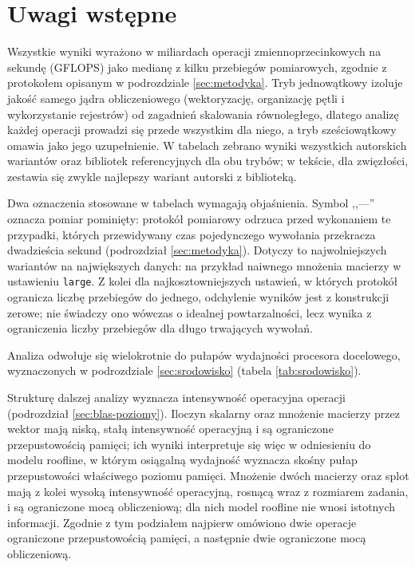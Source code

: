 \documentclass[a4paper,12pt]{book} %
\begin{document}
\section{Uwagi wstępne}
\label{sec:wyniki-wstep}

Wszystkie wyniki wyrażono w miliardach operacji zmiennoprzecinkowych na sekundę (GFLOPS) jako medianę z kilku przebiegów pomiarowych, zgodnie z protokołem opisanym w podrozdziale \ref{sec:metodyka}. Tryb jednowątkowy izoluje jakość samego jądra obliczeniowego (wektoryzację, organizację pętli i wykorzystanie rejestrów) od zagadnień skalowania równoległego, dlatego analizę każdej operacji prowadzi się przede wszystkim dla niego, a tryb sześciowątkowy omawia jako jego uzupełnienie. W tabelach zebrano wyniki wszystkich autorskich wariantów oraz bibliotek referencyjnych dla obu trybów; w tekście, dla zwięzłości, zestawia się zwykle najlepszy wariant autorski z biblioteką.

Dwa oznaczenia stosowane w tabelach wymagają objaśnienia. Symbol ,,---'' oznacza pomiar pominięty: protokół pomiarowy odrzuca przed wykonaniem te przypadki, których przewidywany czas pojedynczego wywołania przekracza dwadzieścia sekund (podrozdział \ref{sec:metodyka}). Dotyczy to najwolniejszych wariantów na największych danych: na przykład naiwnego mnożenia macierzy w ustawieniu \texttt{large}. Z kolei dla najkosztowniejszych ustawień, w których protokół ogranicza liczbę przebiegów do jednego, odchylenie wyników jest z konstrukcji zerowe; nie świadczy ono wówczas o idealnej powtarzalności, lecz wynika z ograniczenia liczby przebiegów dla długo trwających wywołań.

Analiza odwołuje się wielokrotnie do pułapów wydajności procesora docelowego, wyznaczonych w podrozdziale \ref{sec:srodowisko} (tabela \ref{tab:srodowisko}).

Strukturę dalszej analizy wyznacza intensywność operacyjna operacji (podrozdział \ref{sec:blas-poziomy}). Iloczyn skalarny oraz mnożenie macierzy przez wektor mają niską, stałą intensywność operacyjną i są ograniczone przepustowością pamięci; ich wyniki interpretuje się więc w odniesieniu do modelu roofline, w którym osiągalną wydajność wyznacza skośny pułap przepustowości właściwego poziomu pamięci. Mnożenie dwóch macierzy oraz splot mają z kolei wysoką intensywność operacyjną, rosnącą wraz z rozmiarem zadania, i są ograniczone mocą obliczeniową; dla nich model roofline nie wnosi istotnych informacji. Zgodnie z tym podziałem najpierw omówiono dwie operacje ograniczone przepustowością pamięci, a następnie dwie ograniczone mocą obliczeniową.
\end{document}
